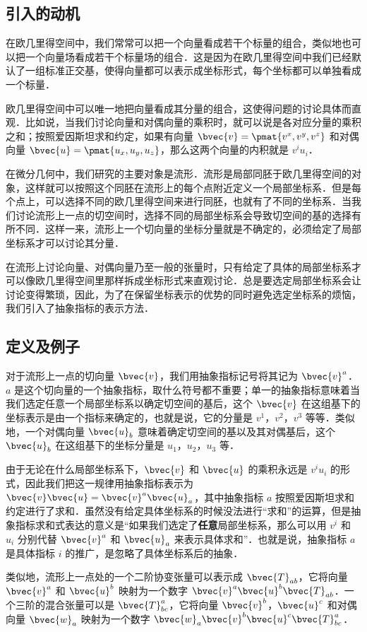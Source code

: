 

\begin{issues}
\issueMissDepend
\end{issues}

\subsection{引入的动机}
在欧几里得空间中，我们常常可以把一个向量看成若干个标量的组合，类似地也可以把一个向量场看成若干个标量场的组合．这是因为在欧几里得空间中我们已经默认了一组标准正交基，使得向量都可以表示成坐标形式，每个坐标都可以单独看成一个标量．

欧几里得空间中可以唯一地把向量看成其分量的组合，这使得问题的讨论具体而直观．比如说，当我们讨论向量和对偶向量的乘积时，就可以说是各对应分量的乘积之和；按照爱因斯坦求和约定，如果有向量 $\bvec{v}=\pmat{v^x, v^y, v^z}$ 和对偶向量 $\bvec{u}=\pmat{u_x, u_y, u_z}$，那么这两个向量的内积就是 $v^iu_i$．

在微分几何中，我们研究的主要对象是流形．流形是局部同胚于欧几里得空间的对象，这样就可以按照这个同胚在流形上的每个点附近定义一个局部坐标系．但是每个点上，可以选择不同的欧几里得空间来进行同胚，也就有了不同的坐标系．当我们讨论流形上一点的切空间时，选择不同的局部坐标系会导致切空间的基的选择有所不同．这样一来，流形上一个切向量的坐标分量就是不确定的，必须给定了局部坐标系才可以讨论其分量．

在流形上讨论向量、对偶向量乃至一般的张量时，只有给定了具体的局部坐标系才可以像欧几里得空间里那样拆成坐标形式来直观讨论．总是要选定局部坐标系会让讨论变得繁琐，因此，为了在保留坐标表示的优势的同时避免选定坐标系的烦恼，我们引入了抽象指标的表示方法．

\subsection{定义及例子}

对于流形上一点的切向量 $\bvec{v}$，我们用抽象指标记号将其记为 $\bvec{v}^a$．$a$ 是这个切向量的一个抽象指标，取什么符号都不重要；单一的抽象指标意味着当我们选定任意一个局部坐标系以确定切空间的基后，这个 $\bvec{v}$ 在这组基下的坐标表示是由一个指标来确定的，也就是说，它的分量是 $v^1$，$v^2$，$v^3$ 等等．类似地，一个对偶向量 $\bvec{u}_b$ 意味着确定切空间的基以及其对偶基后，这个 $\bvec{u}_b$ 在这组基下的坐标分量是 $u_1$，$u_2$，$u_3$ 等．

由于无论在什么局部坐标系下，$\bvec{v}$ 和 $\bvec{u}$ 的乘积永远是 $v^iu_i$ 的形式，因此我们把这一规律用抽象指标表示为 $\bvec{v}\bvec{u}=\bvec{v}^a\bvec{u}_a$，其中抽象指标 $a$ 按照爱因斯坦求和约定进行了求和．虽然没有给定具体坐标系的时候没法进行“求和”的运算，但是抽象指标求和式表达的意义是“如果我们选定了\textbf{任意}局部坐标系，那么可以用 $v^i$ 和 $u_i$ 分别代替 $\bvec{v}^a$ 和 $\bvec{u}_a$ 来表示具体求和”．也就是说，抽象指标 $a$ 是具体指标 $i$ 的推广，是忽略了具体坐标系后的抽象．

类似地，流形上一点处的一个二阶协变张量可以表示成 $\bvec{T}_{ab}$，它将向量 $\bvec{v}^a$ 和 $\bvec{u}^b$ 映射为一个数字 $\bvec{v}^a\bvec{u}^b\bvec{T}_{ab}$．一个三阶的混合张量可以是 $\bvec{T}^a_{bc}$，它将向量 $\bvec{v}^b$，$\bvec{u}^c$ 和对偶向量 $\bvec{w}_a$ 映射为一个数字 $\bvec{w}_a\bvec{v}^b\bvec{u}^c\bvec{T}_{bc}^a$．





